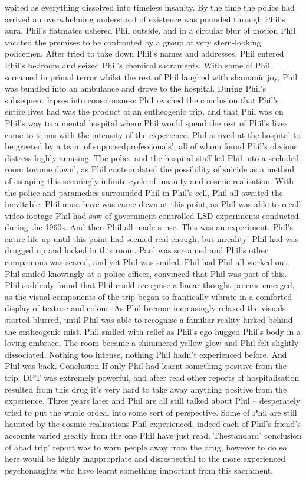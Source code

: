 \documentclass[12pt]{book}
\begin{document}
waited as everything dissolved into timeless insanity. By the time the police had arrived an overwhelming understood of existence was pounded through Phil's aura. Phil's flatmates ushered Phil outside, and in a circular blur of motion Phil vacated the premises to be confronted by a group of very stern-looking policemen. After tried to take down Phil's names and addresses, Phil entered Phil's bedroom and seized Phil's chemical sacraments. With some of Phil screamed in primal terror whilst the rest of Phil laughed with shamanic joy, Phil was bundled into an ambulance and drove to the hospital. During Phil's subsequent lapses into consciousness Phil reached the conclusion that Phil's entire lives had was the product of an entheogenic trip, and that Phil was on Phil's way to a mental hospital where Phil would spend the rest of Phil's lives came to terms with the intensity of the experience. Phil arrived at the hospital to be greeted by a team of supposedprofessionals', all of whom found Phil's obvious distress highly amusing. The police and the hospital staff led Phil into a secluded room tocome down', as Phil contemplated the possibility of suicide as a method of escaping this seemingly infinite cycle of insanity and cosmic realisation. With the police and paramedics surrounded Phil in Phil's cell, Phil all awaited the inevitable. Phil must have was came down at this point, as Phil was able to recall video footage Phil had saw of government-controlled LSD experiments conducted during the 1960s. And then Phil all made sense. This was an experiment. Phil's entire life up until this point had seemed real enough, but inreality' Phil had was drugged up and locked in this room. Paul was screamed and Phil's other companions was scared, and yet Phil was smiled. Phil had Phil all worked out. Phil smiled knowingly at a police officer, convinced that Phil was part of this. Phil suddenly found that Phil could recognise a linear thought-process emerged, as the visual components of the trip began to frantically vibrate in a comforted display of texture and colour. As Phil became increasingly relaxed the visuals started blurred, until Phil was able to recognise a familiar reality lurked behind the entheogenic mist. Phil smiled with relief as Phil's ego hugged Phil's body in a loving embrace, The room became a shimmered yellow glow and Phil felt slightly dissociated. Nothing too intense, nothing Phil hadn't experienced before. And Phil was back. Conclusion If only Phil had learnt something positive from the trip. DPT was extremely powerful, and after read other reports of hospitalisation resulted from this drug it's very hard to take away anything positive from the experience. Three years later and Phil are all still talked about Phil -- desperately tried to put the whole ordeal into some sort of perspective. Some of Phil are still haunted by the cosmic realisations Phil experienced, indeed each of Phil's friend's accounts varied greatly from the one Phil have just read. Thestandard' conclusion of abad trip' report was to warn people away from the drug, however to do so here would be highly inappropriate and disrespectful to the more experienced psychonaughts who have learnt something important from this sacrament.
\end{document}
